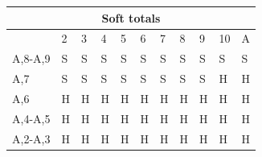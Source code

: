 \documentclass[conference]{IEEEtran}
\begin{document}
\begin{table}[ht]
\begin{tabular}{|l|l|l|l|l|l|l|l|l|l|l|}
\multicolumn{11}{|c|}{\textbf{Soft totals}}                           \\ \hline
                             & 2 & 3 & 4 & 5 & 6 & 7 & 8 & 9 & 10 & A \\ \hline
A,8-A,9                      & \cellcolor{red!75}S & \cellcolor{red!75}S & \cellcolor{red!75}S & \cellcolor{red!75}S & \cellcolor{red!75}S & \cellcolor{red!75}S & \cellcolor{red!75}S & \cellcolor{red!75}S & \cellcolor{red!75}S & \cellcolor{red!75}S  \\ \hline
A,7                          & \cellcolor{red!75}S & \cellcolor{red!75}S & \cellcolor{red!75}S & \cellcolor{red!75}S & \cellcolor{red!75}S & \cellcolor{red!75}S & \cellcolor{red!75}S & \cellcolor{red!75}S & \cellcolor{green!50}H & \cellcolor{green!50}H  \\ \hline
A,6                          & \cellcolor{green!50}H & \cellcolor{green!50}H & \cellcolor{green!50}H & \cellcolor{green!50}H & \cellcolor{green!50}H & \cellcolor{green!50}H & \cellcolor{green!50}H & \cellcolor{green!50}H & \cellcolor{green!50}H & \cellcolor{green!50}H  \\ \hline
A,4-A,5                      & \cellcolor{green!50}H & \cellcolor{green!50}H & \cellcolor{green!50}H & \cellcolor{green!50}H & \cellcolor{green!50}H & \cellcolor{green!50}H & \cellcolor{green!50}H & \cellcolor{green!50}H & \cellcolor{green!50}H & \cellcolor{green!50}H  \\ \hline
A,2-A,3                      & \cellcolor{green!50}H & \cellcolor{green!50}H & \cellcolor{green!50}H & \cellcolor{green!50}H & \cellcolor{green!50}H & \cellcolor{green!50}H & \cellcolor{green!50}H & \cellcolor{green!50}H & \cellcolor{green!50}H & \cellcolor{green!50}H  \\ \hline \hline


\end{tabular}
\end{table}
\end{document}
